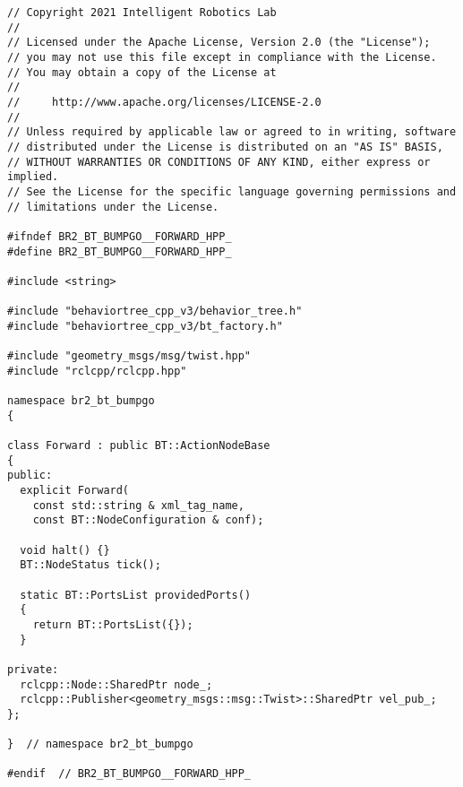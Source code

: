  \footnotesize
\begin{tcolorbox}[sharp corners, colframe=gray!80, colback=LightGray, left=0pt, top=0pt, bottom=0pt, title=\texttt{br2\_bt\_bumpgo/include/br2\_bt\_bumpgo/Forward.hpp}]
  \begin{verbatim}
// Copyright 2021 Intelligent Robotics Lab
//
// Licensed under the Apache License, Version 2.0 (the "License");
// you may not use this file except in compliance with the License.
// You may obtain a copy of the License at
//
//     http://www.apache.org/licenses/LICENSE-2.0
//
// Unless required by applicable law or agreed to in writing, software
// distributed under the License is distributed on an "AS IS" BASIS,
// WITHOUT WARRANTIES OR CONDITIONS OF ANY KIND, either express or implied.
// See the License for the specific language governing permissions and
// limitations under the License.

#ifndef BR2_BT_BUMPGO__FORWARD_HPP_
#define BR2_BT_BUMPGO__FORWARD_HPP_

#include <string>

#include "behaviortree_cpp_v3/behavior_tree.h"
#include "behaviortree_cpp_v3/bt_factory.h"

#include "geometry_msgs/msg/twist.hpp"
#include "rclcpp/rclcpp.hpp"

namespace br2_bt_bumpgo
{

class Forward : public BT::ActionNodeBase
{
public:
  explicit Forward(
    const std::string & xml_tag_name,
    const BT::NodeConfiguration & conf);

  void halt() {}
  BT::NodeStatus tick();

  static BT::PortsList providedPorts()
  {
    return BT::PortsList({});
  }

private:
  rclcpp::Node::SharedPtr node_;
  rclcpp::Publisher<geometry_msgs::msg::Twist>::SharedPtr vel_pub_;
};

}  // namespace br2_bt_bumpgo

#endif  // BR2_BT_BUMPGO__FORWARD_HPP_
    \end{verbatim}
    \end{tcolorbox}
  \normalsize

